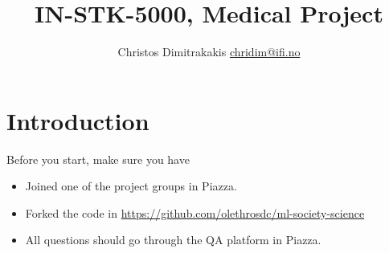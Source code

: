 \documentclass[a4paper,twoside]{article}
\title{IN-STK-5000, Medical Project}
\author{Christos Dimitrakakis \url{chridim@ifi.no}}
\begin{document}
\maketitle
\section{Introduction}
Before you start, make sure you have
\begin{itemize}
\item Joined one of the project groups in Piazza.
\item Forked the code in \url{https://github.com/olethrosdc/ml-society-science}
\item All questions should go through the QA platform in Piazza.
\end{itemize}


%
%
\end{document}
